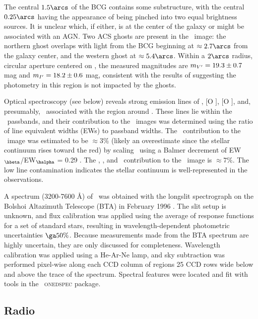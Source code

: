 \documentclass{emulateapj}
\begin{document}
The central $1.5\arcs$ of the BCG contains some substructure, with the
central $0.25\arcs$ having the appearance of being pinched into two
equal brightness sources. It is unclear which, if either, is at the
center of the galaxy or might be associated with an AGN. Two ACS
ghosts \citep{acsghost} are present in the \myi\ image: the northern
ghost overlaps with light from the BCG beginning at $\approx 2.7\arcs$
from the galaxy center, and the western ghost at $\approx
5.4\arcs$. Within a $2\arcs$ radius, circular aperture centered on
\rbs, the measured magnitudes are $m_{V^{\prime}} = 19.3 \pm 0.7$ mag and
$m_{I^{\prime}} = 18.2 \pm 0.6$ mag, consistent with the results of
\citet{rbs1} suggesting the photometry in this region is not impacted
by the ghosts.

Optical spectroscopy (see below) reveals strong emission lines of
\hbeta, [O ], [O ], and, presumably,
\halpha\ associated with the region around \rbs. These lines lie
within the \hst\ passbands, and their contribution to the \hst\ images
was determined using the ratio of line equivalent widths (EWs) to
passband widths. The \halpha\ contribution to the \myi\ image was
estimated to be $\approx 3\%$ (likely an overestimate since the
stellar continuum rises toward the red) by scaling \hbeta\ using a
Balmer decrement of EW$_{\hbeta}$/EW$_{\halpha}$ = 0.29
\citep{2006ApJ...642..775M}. The \hbeta, \oii, and \oiii\ contribution
to the \myv\ image is $\approx 7\%$. The low line contamination
indicates the stellar continuum is well-represented in the
observations.

A spectrum (3200-7600 \AA) of \rbs\ was obtained with the longslit
spectrograph on the Bolshoi Altazimuth Telescope (BTA) in February
1996 \citep{rbs1}. The slit setup is unknown, and flux calibration was
applied using the average of response functions for a set of standard
stars, resulting in wavelength-dependent photometric uncertainties
$\ga 50\%$. Because measurements made from the BTA spectrum are highly
uncertain, they are only discussed for completeness. Wavelength
calibration was applied using a He-Ar-Ne lamp, and sky subtraction was
performed pixel-wise along each CCD column of regions 25 CCD rows wide
below and above the trace of the spectrum. Spectral features were
located and fit with tools in the \iraf\ {\textsc{onedspec}} package.

\subsection{Radio}
\end{document}
